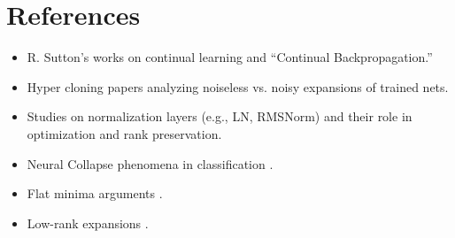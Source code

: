 \documentclass[11pt]{article}
\begin{document}
\section*{References}
\begin{itemize}
    \item R. Sutton's works on continual learning and ``Continual Backpropagation.''
    \item Hyper cloning papers analyzing noiseless vs. noisy expansions of trained nets.
    \item Studies on normalization layers (e.g., LN, RMSNorm) and their role in optimization and rank preservation.
    \item Neural Collapse phenomena in classification \cite{Papyan2020neural}.
    \item Flat minima arguments \cite{Hochreiter1997flat, Keskar2017large}.
    \item Low-rank expansions \cite{Arora2019finegrain,Chaudhari2019entropy}.
\end{itemize}
\end{document}
